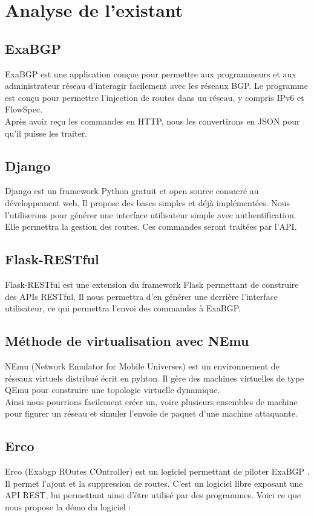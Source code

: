 \chapter{Analyse de l'existant}

\section{ExaBGP}
ExaBGP est une application conçue pour permettre aux programmeurs et aux administrateur réseau d’interagir facilement avec les réseaux BGP. Le programme est conçu pour permettre l’injection de routes dans un réseau, y compris IPv6 et FlowSpec.
\cite{Man10} \\ \indent
Après avoir reçu les commandes en HTTP, nous les convertirons en JSON pour qu'il puisse les traiter.

\section{Django}
Django est un framework Python gratuit et open source consacré au développement web. Il propose des bases simples et déjà implémentées. Nous l'utiliserons pour générer une interface utilisateur simple avec authentification. Elle permettra la gestion des routes. Ces commandes seront traitées par l'API.

\section{Flask-RESTful}
Flask-RESTful est une extension du framework Flask permettant de construire des APIs RESTful. Il nous permettra d'en générer une derrière l'interface utilisateur, ce qui permettra l'envoi des commandes à ExaBGP.

\section{Méthode de virtualisation avec NEmu}
NEmu (Network Emulator for Mobile Universes) est un environnement de réseaux virtuels distribué écrit en pyhton. Il gère des machines virtuelles de type QEmu pour construire une topologie virtuelle dynamique. \\ \indent
Ainsi nous pourrions facilement créer un, voire plusieurs ensembles de machine pour figurer un réseau et simuler l'envoie de paquet d'une machine attaquante.

\section{Erco}
Erco (Exabgp ROutes COntroller) est un logiciel permettant de piloter ExaBGP \cite{Did15}. Il permet l'ajout et la suppression de routes. C'est un logiciel libre exposant une API REST, lui permettant ainsi d'être utilisé par des programmes. Voici ce que nous propose la démo du logiciel \cite{Erc16} :


